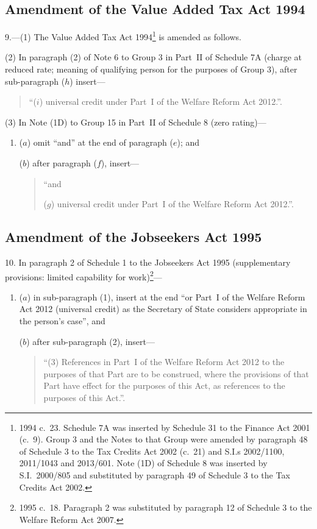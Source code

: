 \documentclass[12pt,a4paper]{article}
\begin{document}
\subsection[9. Amendment of the Value Added Tax Act 1994]{Amendment of the Value Added Tax Act 1994}

9.—(1) The Value Added Tax Act 1994\footnote{1994 c.~23. Schedule 7A was inserted by Schedule 31 to the Finance Act 2001 (c.~9). Group 3 and the Notes to that Group were amended by paragraph 48 of Schedule 3 to the Tax Credits Act 2002 (c.~21) and S.I.s 2002/1100, 2011/1043 and 2013/601. Note (1D) of Schedule 8 was inserted by S.I.~2000/805 and substituted by paragraph 49 of Schedule 3 to the Tax Credits Act 2002.} is amended as follows.

(2) In paragraph (2) of Note 6 to Group 3 in Part~II of Schedule 7A (charge at reduced rate; meaning of qualifying person for the purposes of Group 3), after sub-paragraph ($h$)  insert—
\begin{quotation}
“($i$) universal credit under Part~I of the Welfare Reform Act 2012.”.
\end{quotation}

(3) In Note (1D) to Group 15 in Part~II of Schedule 8 (zero rating)—
\begin{enumerate}\item[]
($a$) omit “and” at the end of paragraph ($e$); and

($b$) after paragraph ($f$), insert—
\begin{quotation}
“and

($g$) universal credit under Part~I of the Welfare Reform Act 2012.”.
\end{quotation}
\end{enumerate}

\subsection[10. Amendment of the Jobseekers Act 1995]{Amendment of the Jobseekers Act 1995}

10.  In paragraph 2 of Schedule 1 to the Jobseekers Act 1995 (supplementary provisions: limited capability for work)\footnote{1995 c.~18. Paragraph 2 was substituted by paragraph 12 of Schedule 3 to the Welfare Reform Act 2007.}—
\begin{enumerate}\item[]
($a$) in sub-paragraph (1), insert at the end “or Part~I of the Welfare Reform Act 2012 (universal credit) as the Secretary of State considers appropriate in the person’s case”, and

($b$) after sub-paragraph (2), insert—
\begin{quotation}
“(3) References in Part~I of the Welfare Reform Act 2012 to the purposes of that Part are to be construed, where the provisions of that Part have effect for the purposes of this Act, as references to the purposes of this Act.”.
\end{quotation}
\end{enumerate}
\end{document}
